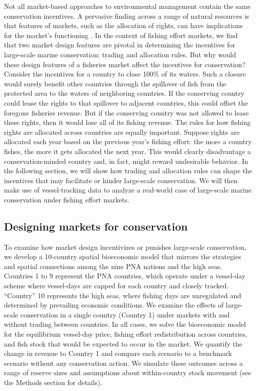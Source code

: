 \documentclass[12pt]{article}
\begin{document}
Not all market-based approaches to environmental management contain the same conservation incentives. A pervasive finding across a range of natural resources is that features of markets, such as the allocation of rights, can have implications for the market's functioning \cite{libecap_1989}. In the context of fishing effort markets, we find that two market design features are pivotal in determining the incentives for large-scale marine conservation: trading and allocation rules. But why would these design features of a fisheries market affect the incentives for conservation? Consider the incentives for a country to close 100\% of its waters. Such a closure would surely benefit other countries through the spillover of fish from the protected area to the waters of neighboring countries. If the conserving country could lease the rights to that spillover to adjacent countries, this could offset the foregone fisheries revenue. But if the conserving country was not allowed to lease these rights, then it would lose all of its fishing revenue. The rules for how fishing rights are allocated across countries are equally important. Suppose rights are allocated each year based on the previous year's fishing effort: the more a country fishes, the more it gets allocated the next year. This would clearly disadvantage a conservation-minded country and, in fact, might reward undesirable behavior. In the following section, we will show how trading and allocation rules can shape the incentives that may facilitate or hinder large-scale conservation. We will then make use of vessel-tracking data to analyze a real-world case of large-scale marine conservation under fishing effort markets.

\subsection{Designing markets for conservation}

To examine how market design incentivizes or punishes large-scale conservation, we develop a 10-country spatial bioeconomic model that mirrors the strategies and spatial connections among the nine PNA nations and the high seas. Countries 1 to 9 represent the PNA countries, which operate under a vessel-day scheme where vessel-days are capped for each country and closely tracked. ``Country'' 10 represents the high seas, where fishing days are unregulated and determined by prevailing economic conditions. We examine the effects of large-scale conservation in a single country (Country 1) under markets with and without trading between countries. In all cases, we solve the bioeconomic model for the equilibrium vessel-day price, fishing effort redistribution across countries, and fish stock that would be expected to occur in the market. We quantify the change in revenue to Country 1 and compare each scenario to a benchmark scenario without any conservation action. We simulate these outcomes across a range of reserve sizes and assumptions about within-country stock movement (see the Methods section for details).
\end{document}
